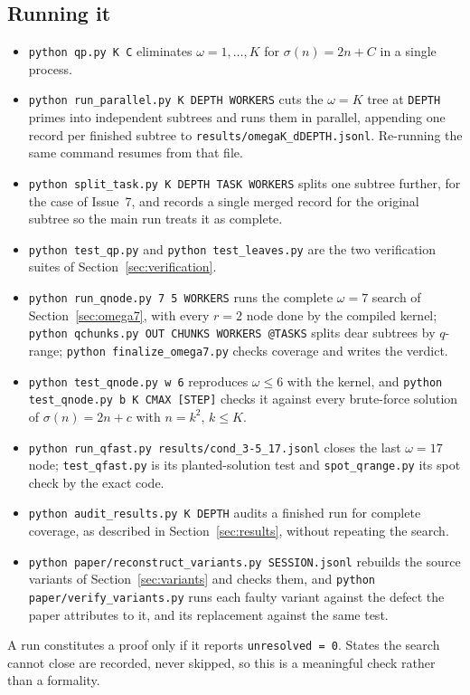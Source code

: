 \documentclass[11pt]{amsart}
\theoremstyle{remark}
\begin{document}
\subsection{Running it}
\begin{itemize}
\item \texttt{python qp.py K C} eliminates $\omega = 1, \dots, K$ for
  $\sigma(n) = 2n + C$ in a single process.
\item \texttt{python run\_parallel.py K DEPTH WORKERS} cuts the $\omega = K$
  tree at \texttt{DEPTH} primes into independent subtrees and runs them in
  parallel, appending one record per finished subtree to
  \texttt{results/omegaK\_dDEPTH.jsonl}. Re-running the same command resumes
  from that file.
\item \texttt{python split\_task.py K DEPTH TASK WORKERS} splits one subtree
  further, for the case of Issue~7, and records a single merged record for the
  original subtree so the main run treats it as complete.
\item \texttt{python test\_qp.py} and \texttt{python test\_leaves.py} are the
  two verification suites of Section~\ref{sec:verification}.
\item \texttt{python run\_qnode.py 7 5 WORKERS} runs the complete $\omega = 7$
  search of Section~\ref{sec:omega7}, with every $r = 2$ node done by the compiled
  kernel; \texttt{python qchunks.py OUT CHUNKS WORKERS @TASKS} splits dear
  subtrees by $q$-range; \texttt{python finalize\_omega7.py} checks coverage and
  writes the verdict.
\item \texttt{python test\_qnode.py w 6} reproduces $\omega \le 6$ with the
  kernel, and \texttt{python test\_qnode.py b K CMAX [STEP]} checks it against every
  brute-force solution of $\sigma(n) = 2n + c$ with $n = k^{2}$, $k \le K$.
\item \texttt{python run\_qfast.py results/cond\_3-5\_17.jsonl} closes the last
  $\omega = 17$ node; \texttt{test\_qfast.py} is its planted-solution test and
  \texttt{spot\_qrange.py} its spot check by the exact code.
\item \texttt{python audit\_results.py K DEPTH} audits a finished run for
  complete coverage, as described in Section~\ref{sec:results}, without
  repeating the search.
\item \texttt{python paper/reconstruct\_variants.py SESSION.jsonl} rebuilds the
  source variants of Section~\ref{sec:variants} and checks them, and
  \texttt{python paper/verify\_variants.py} runs each faulty variant against the
  defect the paper attributes to it, and its replacement against the same test.
\end{itemize}
A run constitutes a proof only if it reports \texttt{unresolved = 0}. States the
search cannot close are recorded, never skipped, so this is a meaningful check
rather than a formality.
\end{document}
